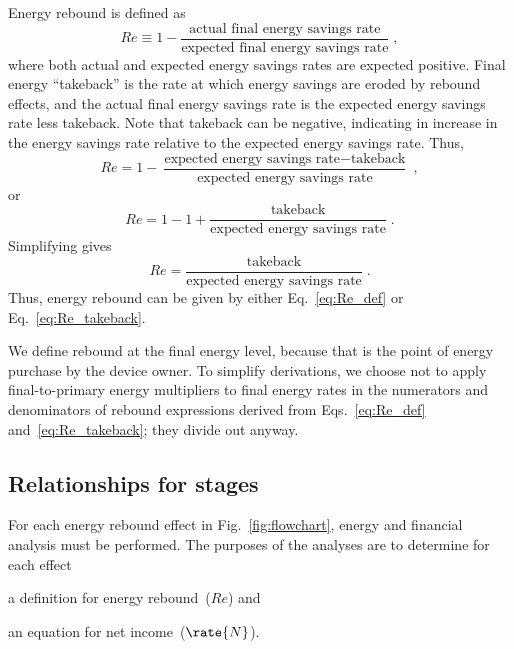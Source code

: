 Energy rebound is defined as
%
\begin{equation} \label{eq:Re_def}
  Re \equiv 1 - \frac{\text{actual final energy savings rate}}{\text{expected final energy savings rate}} \; ,
\end{equation}
%
where both actual and expected energy savings rates are expected positive.
Final energy ``takeback'' is the rate at which energy savings are eroded by rebound effects,
and the actual final energy savings rate is the expected energy savings rate less takeback.
Note that takeback can be negative, indicating in increase in the energy savings rate
relative to the expected energy savings rate.
Thus,
%
\begin{equation}
  Re = 1 - \frac{\text{expected energy savings rate} - \text{takeback}}{\text{expected energy savings rate}} \; ,
\end{equation}
%
or
%
\begin{equation}
  Re = 1 - 1 + \frac{\text{takeback}}{\text{expected energy savings rate}} \; .
\end{equation}
%
Simplifying gives
%
\begin{equation} \label{eq:Re_takeback}
  Re = \frac{\text{takeback}}{\text{expected energy savings rate}} \; .
\end{equation}
%
Thus, energy rebound can be given by either Eq.~\ref{eq:Re_def} or Eq.~\ref{eq:Re_takeback}.

We define rebound at the final energy level, 
because that is the point of energy purchase by the device owner.
To simplify derivations, 
we choose not to apply final-to-primary energy multipliers
to final energy rates in the numerators and denominators of rebound expressions
derived from Eqs.~\ref{eq:Re_def} and~\ref{eq:Re_takeback};
they divide out anyway.


\subsection{Relationships for stages}
\label{sec:relationships_for_stages}

For each energy rebound effect in Fig.~\ref{fig:flowchart},
energy and financial analysis must be performed.
The purposes of the analyses are to determine for each effect
%
\begin{enumerate*}[label={(\alph*)}]

  \item a definition for energy rebound~($Re$) and

  \item an equation for net income~($\rate{N}$).

\end{enumerate*}

